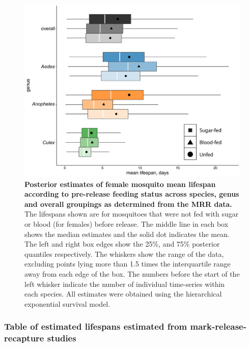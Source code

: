 \documentclass[12pt]{article}
\begin{document}
{\begin{figure}[h]
	\centerline{\includegraphics[width=1\textwidth]{./Figure_files/mrr_female_blood_sugar.pdf}}
	\caption{\textbf{Posterior estimates of female mosquito mean lifespan according to pre-release feeding status across species, genus and overall groupings as determined from the MRR data.} The lifespans shown are for mosquitoes that were not fed with sugar or blood (for females) before release. The middle line in each box shows the median estimates and the solid dot indicates the mean. The left and right box edges show the 25\%, and 75\% posterior quantiles respectively. The whiskers show the range of the data, excluding points lying more than 1.5 times the interquartile range away from each edge of the box. The numbers before the start of the left whisker indicate the number of individual time-series within each species. All estimates were obtained using the hierarchical exponential survival model.}
	\label{fig:mrr_female_blood_sugar}
\end{figure}


\subsubsection{Table of estimated lifespans estimated from mark-release-recapture studies}

}
\end{document}
